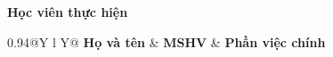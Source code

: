\begin{titlepage}
\begin{minipage}[t][0.97\textheight][t]{\textwidth}
\vspace{0.38cm}
{\normalsize\bfseries Học viên thực hiện\par}
\vspace{0.15cm}
{\small\renewcommand{\arraystretch}{1.15}
\begin{tabularx}{0.94\textwidth}{@{}Y l Y@{}}
  \toprule
  \textbf{Họ và tên} & \textbf{MSHV} & \textbf{Phần việc chính} \\
  \midrule
  \memberlist
  \bottomrule
\end{tabularx}\par}

\vfill
{\small \placeanddate\par}
\end{minipage}
\end{titlepage}
